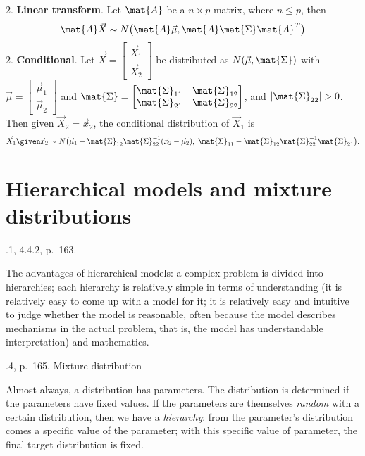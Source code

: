 \documentclass[12pt]{article}
\begin{document}
2. \textbf{Linear transform}.
    Let $\mat{A}$ be a $n \times p$ matrix, where $n \le p$,
    then
    \[
    \mat{A}\vec{X}
    \sim N\bigl(\mat{A}\vec{\mu},
        \mat{A}\mat{\Sigma}\mat{A}^T\bigr)
    \]
2. \textbf{Conditional}.
Let
$\vec{X} = \begin{bmatrix}\vec{X}_1 \\ \vec{X}_2\end{bmatrix}$
be distributed as $N(\vec{\mu}, \mat{\Sigma})$ with
$\vec{\mu} = \begin{bmatrix}\vec{\mu}_1 \\ \vec{\mu}_2\end{bmatrix}$
and
$\mat{\Sigma} = \begin{bmatrix}
    \mat{\Sigma}_{11} & \mat{\Sigma}_{12} \\
    \mat{\Sigma}_{21} & \mat{\Sigma}_{22}\end{bmatrix}$,
and $|\mat{\Sigma}_{22}| > 0$.
Then given $\vec{X}_2 = \vec{x}_2$,
the conditional distribution of $\vec{X}_1$ is
\[
\vec{X}_1 \given \vec{x}_2
\sim
N\bigl(
    \vec{\mu}_1 +
        \mat{\Sigma}_{12} \mat{\Sigma}_{22}^{-1}
            (\vec{x}_2 - \vec{\mu}_2)
    ,\;
    \mat{\Sigma}_{11} -
        \mat{\Sigma}_{12} \mat{\Sigma}_{22}^{-1} \mat{\Sigma}_{21}
    \bigr)
.
\]



\section{Hierarchical models and mixture distributions}

.1, 4.4.2, p.~163.

The advantages of hierarchical models:
a complex problem is divided into hierarchies;
each hierarchy is relatively simple in terms of understanding
(it is relatively easy to come up
with a model for it; it is relatively easy and intuitive to judge
whether the model is reasonable, often because the model describes
mechanisms in the actual problem, that is, the model has understandable
interpretation)
and mathematics.

.4, p.~165. Mixture distribution

Almost always, a distribution has parameters.
The distribution is determined if the parameters have fixed values.
If the parameters are themselves \emph{random} with a certain
distribution, then we have a \emph{hierarchy}:
from the parameter's distribution comes a specific value of the
parameter; with this specific value of parameter, the final target
distribution is fixed.
\end{document}
